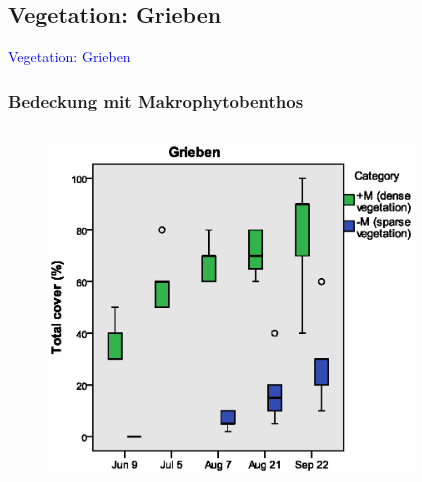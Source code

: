 \documentclass[xcolor=dvipsnames]{beamer}
\begin{document}
\subsection{Vegetation: Grieben}
\begin{frame}
\center
\textcolor{Blue}{{\LARGE Vegetation: Grieben}}
\end{frame}

\begin{frame}
\frametitle{Bedeckung mit Makrophytobenthos}
\begin{columns}
\begin{column}{5.5cm}
\begin{figure}
\includegraphics[width=\textwidth]{images/total_cover/total_cover2.eps}
\end{figure}
\end{column}
\begin{column}{5.5cm}
\begin{overprint}
\begin{figure}

\end{figure}
\end{overprint}
\end{column}
\end{columns}
\end{frame}
\end{document}
